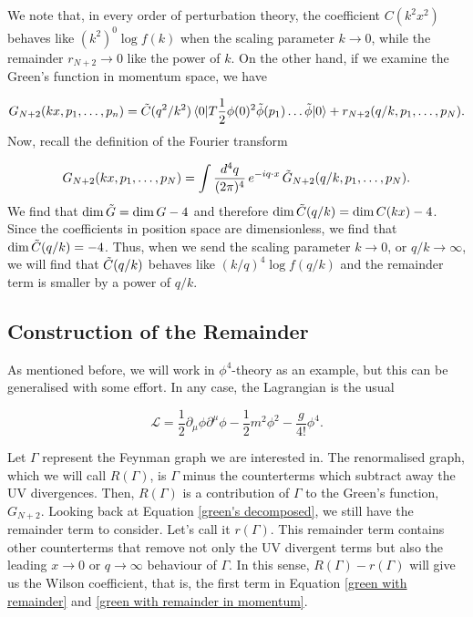 \documentclass{article}
\begin{document}
We note that, in every order of perturbation theory, the coefficient $C(k^2x^2)$ behaves like $(k^2)^0\log f(k)$ when the scaling parameter $k\rightarrow 0$, while the remainder $r_{N+2}\rightarrow0$ like the power of $k$. On the other hand, if we examine the Green's function in momentum space, we have 

\begin{equation}
    G_{N+2}(kx, p_1,\dots, p_n) = \Tilde{C}(q^2/k^2)\mel{0}{T\frac{1}{2}\phi(0)^2\Tilde{\phi}(p_1)\dots\Tilde{\phi}}{0} + r_{N+2}(q/k,p_1,\dots,p_N).
    \label{green with remainder}
\end{equation}
Now, recall the definition of the Fourier transform

\begin{equation}
    G_{N+2}(kx,p_1,\dots,p_N) = \int \frac{d^4q}{(2\pi)^4} \, e^{-iq\cdot x} \, \Tilde{G}_{N+2}(q/k,p_1,\dots,p_N).
    \label{green with remainder in momentum}
\end{equation}
We find that $\mathrm{dim}\,\Tilde{G} = \mathrm{dim}\,G-4$ and therefore $\mathrm{dim}\,\Tilde{C}(q/k) = \mathrm{dim}\,C(kx)-4$. Since the coefficients in position space are dimensionless, we find that $\mathrm{dim}\,\Tilde{C}(q/k)=-4$. Thus, when we send the scaling parameter $k\rightarrow 0$, or $q/k \rightarrow \infty$, we will find that $\Tilde{C}(q/k)$ behaves like $(k/q)^4 \log f(q/k) $ and the remainder term is smaller by a power of $q/k$. 

\subsection{Construction of the Remainder}\label{construct remainder}

As mentioned before, we will work in $\phi^4$-theory as an example, but this can be generalised with  some effort. In any case, the Lagrangian is the usual

\begin{equation}
    \mathcal{L}= \frac{1}{2}\partial_\mu\phi\partial^\mu\phi - \frac{1}{2}m^2\phi^2 - \frac{g}{4!}\phi^4.
\end{equation}

Let $\Gamma$ represent the Feynman graph we are interested in. The renormalised graph, which we will call $R(\Gamma)$, is $\Gamma$ minus the counterterms which subtract away the UV divergences. Then, $R(\Gamma)$ is a contribution of $\Gamma$ to the Green's function, $G_{N+2}$. Looking back at Equation \ref{green's decomposed}, we still have the remainder term to consider. Let's call it $r(\Gamma)$. This remainder term contains other counterterms that remove not only the UV divergent terms but also the leading $x\rightarrow 0$ or $q \rightarrow \infty$ behaviour of $\Gamma$. In this sense, $R(\Gamma) - r(\Gamma)$ will give us the Wilson coefficient, that is, the first term in Equation \ref{green with remainder} and \ref{green with remainder in momentum}.
\end{document}
